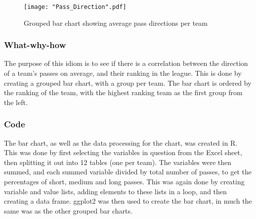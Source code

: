 \documentclass[Report.tex]{subfiles}
\begin{document}
\begin{figure}
\center
\texttt{[image: "Pass\_Direction".pdf]}
\caption{Grouped bar chart showing average pass directions per team}
\label{Fig:Pass_Direction} 
\end{figure}

\subsubsection{What-why-how}
The purpose of this idiom is to see if there is a correlation between the
direction of a team's passes on average, and their ranking in the league. 
This is done by creating a grouped bar chart, with a group per team. The bar
chart is ordered by the ranking of the team, with the highest ranking team as
the first group from the left.


\subsubsection{Code}
The bar chart, as well as the data processing for the chart, was created in R.
This was done by first selecting the variables in question from the Excel sheet,
then splitting it out into 12 tables (one per team). The variables were then
summed, and each summed variable divided by total number of passes, to get the
percentages of short, medium and long passes. This was again done by creating
variable and value lists, adding elements to these lists in a loop, and then
creating a data frame. 
ggplot2 was then used to create the bar chart, in much the same was as the other
grouped bar charts. 
\end{document}
